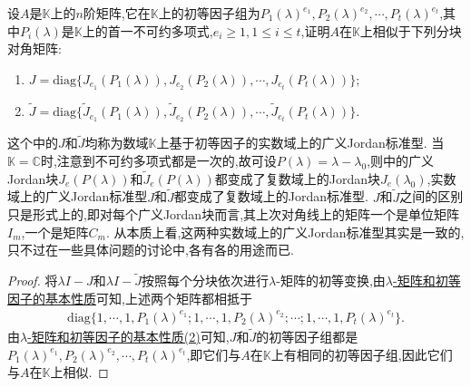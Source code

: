 \documentclass[../../main.tex]{subfiles}
\begin{document}
\begin{proposition}\label{proposition:广义标准型理论相关结论1}
设$A$是$\mathbb{K}$上的$n$阶矩阵,它在$\mathbb{K}$上的初等因子组为$P_1(\lambda)^{e_1},P_2(\lambda)^{e_2},\cdots,P_t(\lambda)^{e_t}$,其中$P_i(\lambda)$是$\mathbb{K}$上的首一不可约多项式,$e_i\geqslant 1, 1\leqslant i\leqslant t$,证明$A$在$\mathbb{K}$上相似于下列分块对角矩阵:
\begin{enumerate}[(1)]
\item $J = \mathrm{diag}\{J_{e_1}(P_1(\lambda)),J_{e_2}(P_2(\lambda)),\cdots,J_{e_t}(P_t(\lambda))\};$

\item $\widetilde{J} = \mathrm{diag}\{\widetilde{J}_{e_1}(P_1(\lambda)),\widetilde{J}_{e_2}(P_2(\lambda)),\cdots,\widetilde{J}_{e_t}(P_t(\lambda))\}.$
\end{enumerate}
\end{proposition}
\begin{remark}
这个中的$J$和$\widetilde{J}$均称为数域$\mathbb{K}$上基于初等因子的实数域上的广义Jordan标准型. 当$\mathbb{K}=\mathbb{C}$时,注意到不可约多项式都是一次的,故可设$P(\lambda)=\lambda - \lambda_0$,则中的广义Jordan块$J_e(P(\lambda))$和$\widetilde{J}_e(P(\lambda))$都变成了复数域上的Jordan块$J_e(\lambda_0)$,实数域上的广义Jordan标准型$J$和$\widetilde{J}$都变成了复数域上的Jordan标准型. $J$和$\widetilde{J}$之间的区别只是形式上的,即对每个广义Jordan块而言,其上次对角线上的矩阵一个是单位矩阵$I_m$,一个是矩阵$C_m$. 从本质上看,这两种实数域上的广义Jordan标准型其实是一致的,只不过在一些具体问题的讨论中,各有各的用途而已. 
\end{remark}
\begin{proof}
将$\lambda I - J$和$\lambda I - \widetilde{J}$按照每个分块依次进行$\lambda$-矩阵的初等变换,由\hyperref[theorem:lambda-矩阵和初等因子的基本性质]{$\lambda$-矩阵和初等因子的基本性质}可知,上述两个矩阵都相抵于
\begin{align*}
\mathrm{diag}\{1,\cdots,1,P_1(\lambda)^{e_1};1,\cdots,1,P_2(\lambda)^{e_2};\cdots;1,\cdots,1,P_t(\lambda)^{e_t}\}.
\end{align*}
由\hyperref[theorem:lambda-矩阵和初等因子的基本性质]{$\lambda$-矩阵和初等因子的基本性质(2)}可知,$J$和$\widetilde{J}$的初等因子组都是$P_1(\lambda)^{e_1},P_2(\lambda)^{e_2},\cdots,P_t(\lambda)^{e_t}$,即它们与$A$在$\mathbb{K}$上有相同的初等因子组,因此它们与$A$在$\mathbb{K}$上相似. 
\end{proof}
\end{document}
